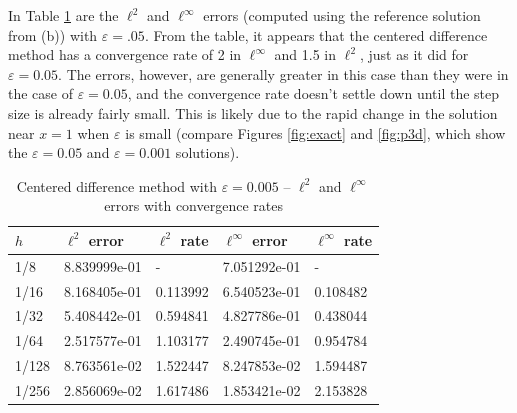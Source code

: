 \documentclass{homework}
\begin{document}
\begin{alphaparts}
		\questionpart In Table \ref{tab:p3e} are the $\ell^2$ and $\ell^\infty$ errors (computed using the reference solution from (b)) with $\varepsilon = .05$. From the table, it appears that the centered difference method has a convergence rate of 2 in $\ell^\infty$ and 1.5 in $\ell^2$, just as it did for $\varepsilon = 0.05$. The errors, however, are generally greater in this case than they were in the case of $\varepsilon = 0.05$, and the convergence rate doesn't settle down until the step size is already fairly small. This is likely due to the rapid change in the solution near $x =1$ when $\varepsilon$ is small (compare Figures \ref{fig:exact} and \ref{fig:p3d}, which show the $\varepsilon = 0.05$ and $\varepsilon = 0.001$ solutions).
		
		\begin{table}[h]
			\centering
			\begin{tabular}{@{}lllll@{}}
				\toprule
				$h$ & $\ell^2$ error & $\ell^2$ rate & $\ell^\infty$ error & $\ell^\infty$ rate \\
				\midrule
				1/8 & 8.839999e-01 & - & 7.051292e-01 & -\\
				1/16 & 8.168405e-01 & 0.113992 & 6.540523e-01 & 0.108482\\
				1/32 & 5.408442e-01 & 0.594841 & 4.827786e-01 & 0.438044\\
				1/64 & 2.517577e-01 & 1.103177 & 2.490745e-01 & 0.954784\\
				1/128 & 8.763561e-02 & 1.522447 & 8.247853e-02 & 1.594487\\
				1/256 & 2.856069e-02 & 1.617486 & 1.853421e-02 & 2.153828\\
				\bottomrule
			\end{tabular}
			\caption{Centered difference method with $\varepsilon = 0.005$ -- $\ell^2$ and $\ell^\infty$ errors with convergence rates}
			\label{tab:p3e}
		\end{table}
	
	\end{alphaparts}
\end{document}
